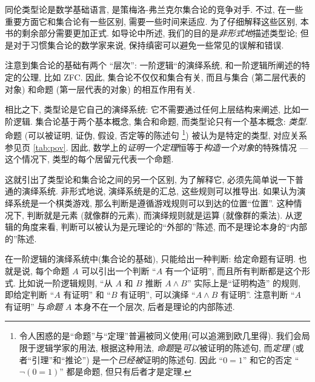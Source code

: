 \label{sec:axioms}

同伦类型论是数学基础语言, 是策梅洛-弗兰克尔集合论的竞争对手.
不过, 在一些重要方面它和集合论有一些区别, 需要一些时间来适应.
为了仔细解释这些区别, 本书的剩余部分需要更加正式.
如导论中所述, 我们的目的是\emph{非形式地}描述类型论;
但是对于习惯集合论的数学家来说, 保持缜密可以避免一些常见的误解和错误.

注意到集合论的基础有两个 ``层次'': 一阶逻辑``的演绎系统, 和一阶逻辑所阐述的特定的公理, 比如 ZFC.
因此, 集合论不仅仅和集合有关, 而且与集合 (第二层代表的对象) 和命题 (第一层代表的对象) 的相互作用有关.

相比之下, 类型论是它自己的演绎系统: 它不需要通过任何上层结构来阐述, 比如一阶逻辑.
集合论基于两个基本概念, 集合和命题, 而类型论只有一个基本概念: \emph{类型}.
命题 (可以被证明, 证伪, 假设, 否定等的陈述句%
\footnote{令人困惑的是``命题''与``定理''普遍被同义使用(可以追溯到欧几里得).
我们会局限于逻辑学家的用法, 根据这种用法, \emph{命题}是\emph{可以}被证明的陈述句, 而\emph{定理}
%
(或者``引理''和``推论'')
是一个\emph{已经被}证明的陈述句.
因此 ``$0=1$'' 和它的否定 ``$\neg(0=1)$'' 都是命题, 但只有后者才是定理.})
被认为是特定的类型, 对应关系参见\pageref{tab:pov}页 \cref{tab:pov}.
因此, 数学上的\emph{证明一个定理}恒等于\emph{构造一个对象}的特殊情况 --- 这个情况下, 类型的每个居留元代表一个命题.

%
这就引出了类型论和集合论之间的另一个区别, 为了解释它, 必须先简单说一下普通的演绎系统.
非形式地说, 演绎系统是的汇总,%
这些规则可以推导出. %
如果认为演绎系统是一个棋类游戏, %
那么判断是遵循游戏规则可以到达的位置``位置''.
这种情况下, 判断就是元素 (就像群的元素), 而演绎规则就是运算 (就像群的乘法).
从逻辑的角度来看, 判断可以被认为是元理论的``外部的''陈述, 而不是理论本身的``内部的''陈述.

在一阶逻辑的演绎系统中(集合论的基础), 只能给出一种判断: 给定命题有证明.
也就是说, 每个命题 $A$ 可以引出一个判断 ``$A$ 有一个证明'', 而且所有判断都是这个形式.
比如说一阶逻辑规则, ``从 $A$ 和 $B$ 推断 $A\wedge B$'' 实际上是``证明构造'' 的规则, 即给定判断 ``$A$ 有证明'' 和 ``$B$ 有证明'', 可以演绎 ``$A\wedge B$ 有证明''.
注意判断 ``$A$ 有证明'' 与\emph{命题} $A$ 本身不在一个层次, 后者是理论的内部陈述.

